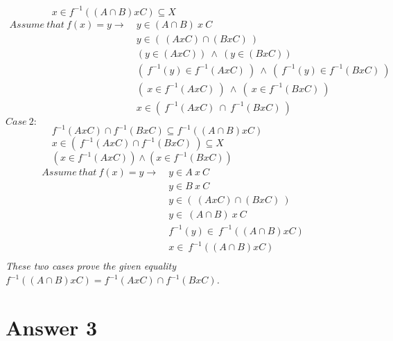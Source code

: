 \documentclass[12pt]{article}
\begin{document}
\vspace{0.1cm}
$\hspace{2cm}x \in f^{-1}((A \cap B)xC) \subseteq X$ 
\begin{equation} 
\begin{split}
Assume\ that\ f(x) = y \rightarrow \ 
& y \in (A \cap B)\ x\ C  \\
& y \in (\ (AxC)\cap (BxC)\ ) \\
& (y \in (AxC))\ \land \ (y \in (BxC)) \\
& (\ f^{-1}(y) \in f^{-1}(AxC)\ )\ \land \ (\ f^{-1}(y) \in f^{-1}(BxC)\ ) \\
& (\ x \in f^{-1}(AxC)\ )\ \land \ (\ x \in f^{-1}(BxC)\ ) \\
& x \in (\ f^{-1}(AxC)\ \cap \ f^{-1}(BxC)\ )
\end{split}
\end{equation}
$Case\ 2:$ \\
\vspace{0.1cm}
$\hspace{2cm}f^{-1}(AxC)\cap f^{-1}(BxC) \subseteq f^{-1}((A \cap B)xC)$ \\
\vspace{0.1cm}
$\hspace{2cm}x \in (\ f^{-1}(AxC)\cap f^{-1}(BxC)\ ) \subseteq X$ \\
\vspace{0.1cm}
$\hspace{2cm}(x \in f^{-1}(AxC))  \land (x \in  f^{-1}(BxC))$ 
\begin{equation} 
\begin{split}
Assume\ that\ f(x) = y \rightarrow \
& y \in A\ x\ C  \ \ \ \ \ \ \ \ \ \ \ \ \ \ \ \ \ \ \ \ \ \ \ \ \ \ \ \ \ \ \ \ \ \ \ \ \ \ \ \ \ \ \ \ \ \ \ \ \ \ \   \\
& y \in B\ x\ C  \\
& y \in (\ (AxC)\cap (BxC)\ ) \\
& y \in \ (A\cap B)\ x\ C \\
& f^{-1}(y) \in \ f^{-1}((A\cap B)xC) \\
& x \in \ f^{-1}((A\cap B)xC) \\
\end{split}
\end{equation}
\vspace{0.5cm}
\hspace{1cm}
\textit{These two cases prove the given equality $f^{-1}((A \cap B)xC) = f^{-1}(AxC)\cap f^{-1}(BxC)$.}

\section*{Answer 3}
\end{document}
